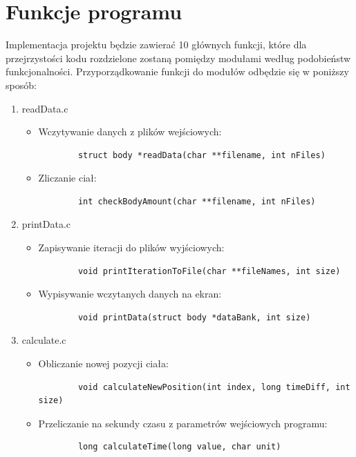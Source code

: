 \documentclass[a4paper,11pt,notitlepage]{article}
\begin{document}
\section{Funkcje programu}
Implementacja projektu będzie zawierać 10 głównych funkcji, które  dla przejrzystości kodu rozdzielone zostaną pomiędzy modułami według podobieństw funkcjonalności. Przyporządkowanie funkcji do modułów odbędzie się w poniższy sposób:
\begin{enumerate}[noitemsep]
	\item readData.c
	\begin{itemize}
		\item Wczytywanie danych z plików wejściowych:
		\footnotesize\begin{verbatim}
		struct body *readData(char **filename, int nFiles)
		\end{verbatim}\normalsize
		\item Zliczanie ciał:
		\footnotesize\begin{verbatim}
		int checkBodyAmount(char **filename, int nFiles)
		\end{verbatim}\normalsize
	\end{itemize}
	\item printData.c
	\begin{itemize}
		\item Zapisywanie iteracji do plików wyjściowych:
		\footnotesize\begin{verbatim}
		void printIterationToFile(char **fileNames, int size)
		\end{verbatim}\normalsize
		\item Wypisywanie wczytanych danych na ekran:
		\footnotesize\begin{verbatim}
		void printData(struct body *dataBank, int size)
		\end{verbatim}\normalsize
	\end{itemize}
	\item calculate.c
	\begin{itemize}
		\item Obliczanie nowej pozycji ciała:
		\footnotesize\begin{verbatim}
		void calculateNewPosition(int index, long timeDiff, int size)
		\end{verbatim}\normalsize
		\item Przeliczanie na sekundy czasu z parametrów wejściowych programu:
		\footnotesize\begin{verbatim}
		long calculateTime(long value, char unit)
		\end{verbatim}\normalsize

\end{itemize}
\end{enumerate}
\end{document}
